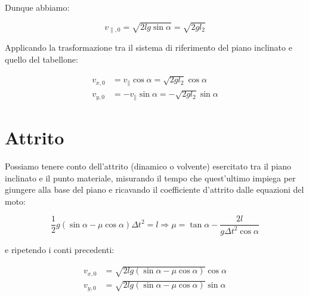 \documentclass{article}
\begin{document}
Dunque abbiamo:

\begin{equation}
v_{\parallel,0} = \sqrt{2lg\sin{\alpha}} = \sqrt{2gl_2}
\end{equation}

Applicando la trasformazione tra il sistema di riferimento del piano inclinato
e quello del tabellone:

\begin{align}
v_{x,0} &= v_\parallel\cos\alpha = \sqrt{2gl_2} \cos\alpha \\
v_{y,0} &= -v_\parallel\sin\alpha = -\sqrt{2gl_2} \sin\alpha 
\end{align}

\section{Attrito}
Possiamo tenere conto dell'attrito (dinamico o volvente) esercitato tra il piano inclinato e il punto
materiale, misurando il tempo che quest'ultimo impiega per giungere alla base del piano e ricavando
il coefficiente d'attrito dalle equazioni del moto:

\begin{equation}
\frac{1}{2} g (\sin\alpha - \mu\cos\alpha) \Delta t^2 = l \Rightarrow \mu = \tan\alpha - \frac{2l}{g\Delta t^2 \cos\alpha} 
\end{equation}

e ripetendo i conti precedenti:

\begin{align}
v_{x,0} &= \sqrt{2lg (\sin{\alpha} - \mu \cos\alpha)} \cos\alpha \\
v_{y,0} &= \sqrt{2lg (\sin{\alpha} - \mu \cos\alpha)} \sin\alpha
\end{align}

{}

\end{document}
